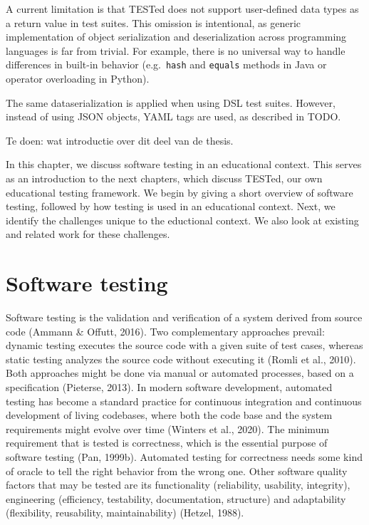 \documentclass[../main]{subfiles}
\begin{document}
A current limitation is that TESTed does not support user-defined data types as a return value in test suites.
This omission is intentional, as generic implementation of object serialization and deserialization across programming languages is far from trivial.
For example, there is no universal way to handle differences in built-in behavior (e.g.\ \texttt{hash} and \texttt{equals} methods in Java or operator overloading in Python).

The same dataserialization is applied when using DSL test suites.
However, instead of using JSON objects, YAML tags are used, as described in TODO.

Te doen: wat introductie over dit deel van de thesis.

In this chapter, we discuss software testing in an educational context.
This serves as an introduction to the next chapters, which discuss TESTed, our own educational testing framework.
We begin by giving a short overview of software testing, followed by how testing is used in an educational context.
Next, we identify the challenges unique to the eductional context.
We also look at existing and related work for these challenges.

\section{Software testing}
\label{sec:software-testing}

Software testing is the validation and verification of a system derived from source code (Ammann \& Offutt, 2016).
Two complementary approaches prevail: dynamic testing executes the source code with a given suite of test cases, whereas static testing analyzes the source code without executing it (Romli et al., 2010). Both approaches might be done via manual or automated processes, based on a specification (Pieterse, 2013). In modern software development, automated testing has become a standard practice for continuous integration and continuous development of living codebases, where both the code base and the system requirements might evolve over time (Winters et al., 2020). The minimum requirement that is tested is correctness, which is the essential purpose of software testing (Pan, 1999b). Automated testing for correctness needs some kind of oracle to tell the right behavior from the wrong one. Other software quality factors that may be tested are its functionality (reliability, usability, integrity), engineering (efficiency, testability, documentation, structure) and adaptability (flexibility, reusability, maintainability) (Hetzel, 1988).
\end{document}
